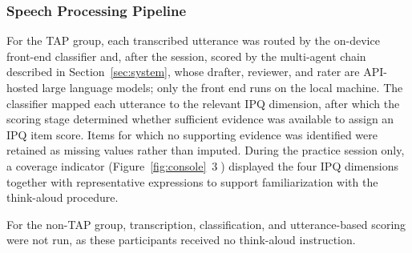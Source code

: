 \subsubsection{Speech Processing Pipeline}



For the TAP group, each transcribed utterance was routed by the on-device front-end classifier and, after the session, scored by the multi-agent chain described in Section~\ref{sec:system}, whose drafter, reviewer, and rater are API-hosted large language models; only the front end runs on the local machine.
The classifier mapped each utterance to the relevant IPQ dimension, after which the scoring stage determined whether sufficient evidence was available to assign an IPQ item score. Items for which no supporting evidence was identified were retained as missing values rather than imputed. During the practice session only, a coverage indicator (Figure~\ref{fig:console}~\textcircled{\scriptsize 3}) displayed the four IPQ dimensions together with representative expressions to support familiarization with the think-aloud procedure.


For the non-TAP group, transcription, classification, and utterance-based scoring were not run, as these participants received no think-aloud instruction.











